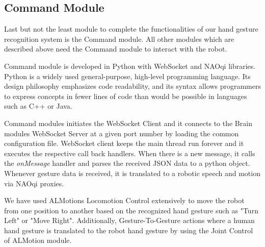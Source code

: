 \subsection{Command Module} Last but not the least module to complete the functionalities of our hand gesture recognition system is the Command module. All other modules which are described above need the Command module to interact with the robot.

Command module is developed in Python with WebSocket and NAOqi libraries. Python is a widely used general-purpose, high-level programming language. Its design philosophy emphasizes code readability, and its syntax allows programmers to express concepts in fewer lines of code than would be possible in languages such as C++ or Java. 

Command modules initiates the WebSocket Client and it connects to the Brain modules WebSocket Server at a given port number by loading the common configuration file. WebSocket client keeps the main thread run forever and it executes the respective call back handlers. When there is a new message, it calls the \textit{onMessage} handler and parses the received JSON data to a python object. Whenever gesture data is received, it is translated to a robotic speech and motion via NAOqi proxies.

We have used ALMotions Locomotion Control extensively to move the robot from one position to another based on the recognized hand gesture such as "Turn Left" or "Move Right". Additionally, Gesture-To-Gesture actions where a human hand gesture is translated to the robot hand gesture by using the Joint Control of ALMotion module.
